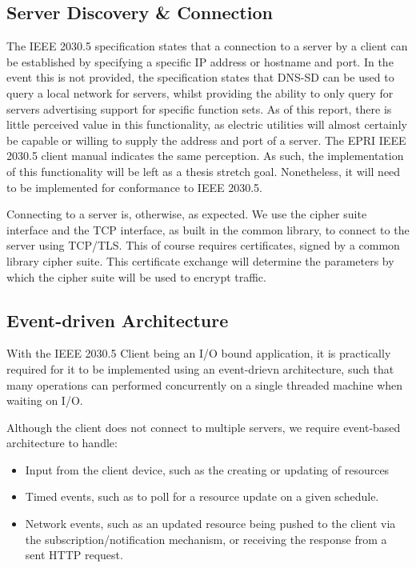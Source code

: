 \subsection{Server Discovery \& Connection}
The IEEE 2030.5 specification states that a connection to a server by a client can be established by specifying a specific IP address or hostname and port.
In the event this is not provided, the specification states that DNS-SD can be used to query a local network for servers, whilst providing the ability to only query for servers advertising support for specific function sets.
As of this report, there is little perceived value in this functionality, as electric utilities will almost certainly be capable or willing to supply the address and port of a server.
The EPRI IEEE 2030.5 client manual indicates the same perception.\cite[]{eprimanual}
As such, the implementation of this functionality will be left as a thesis stretch goal. Nonetheless, it will need to be implemented for conformance to IEEE 2030.5.

Connecting to a server is, otherwise, as expected. We use the cipher suite interface and the TCP interface, as built in the common library, to connect to the server using TCP/TLS.
This of course requires certificates, signed by a common library cipher suite. This certificate exchange will determine the parameters by which the cipher suite will be used to encrypt traffic.

\subsection{Event-driven Architecture}
With the IEEE 2030.5 Client being an I/O bound application, it is practically required for it to be implemented using an event-drievn architecture, such that many operations can performed concurrently on a single threaded machine when waiting on I/O.

Although the client does not connect to multiple servers, we require event-based architecture to handle:
\begin{itemize}
    \item Input from the client device, such as the creating or updating of resources
    \item Timed events, such as to poll for a resource update on a given schedule.
    \item Network events, such as an updated resource being pushed to the client via the subscription/notification mechanism, or receiving the response from a sent HTTP request.
\end{itemize}

